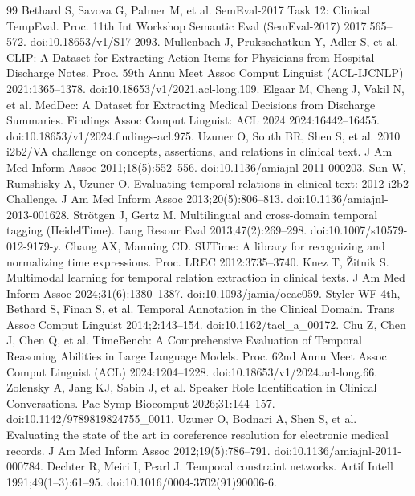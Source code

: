 \documentclass[3p,twocolumn]{elsarticle}
\begin{document}
\begin{thebibliography}{99}
\label{r39} Bethard S, Savova G, Palmer M, et al. SemEval-2017 Task 12: Clinical TempEval. Proc. 11th Int Workshop Semantic Eval (SemEval-2017) 2017:565--572. doi:10.18653/v1/S17-2093.
\label{r40} Mullenbach J, Pruksachatkun Y, Adler S, et al. CLIP: A Dataset for Extracting Action Items for Physicians from Hospital Discharge Notes. Proc. 59th Annu Meet Assoc Comput Linguist (ACL-IJCNLP) 2021:1365--1378. doi:10.18653/v1/2021.acl-long.109.
\label{r41} Elgaar M, Cheng J, Vakil N, et al. MedDec: A Dataset for Extracting Medical Decisions from Discharge Summaries. Findings Assoc Comput Linguist: ACL 2024 2024:16442--16455. doi:10.18653/v1/2024.findings-acl.975.
\label{r42} Uzuner O, South BR, Shen S, et al. 2010 i2b2/VA challenge on concepts, assertions, and relations in clinical text. J Am Med Inform Assoc 2011;18(5):552--556. doi:10.1136/amiajnl-2011-000203.
\label{r43} Sun W, Rumshisky A, Uzuner O. Evaluating temporal relations in clinical text: 2012 i2b2 Challenge. J Am Med Inform Assoc 2013;20(5):806--813. doi:10.1136/amiajnl-2013-001628.
\label{r44} Strötgen J, Gertz M. Multilingual and cross-domain temporal tagging (HeidelTime). Lang Resour Eval 2013;47(2):269--298. doi:10.1007/s10579-012-9179-y.
\label{r45} Chang AX, Manning CD. SUTime: A library for recognizing and normalizing time expressions. Proc. LREC 2012:3735--3740.
\label{r46} Knez T, Žitnik S. Multimodal learning for temporal relation extraction in clinical texts. J Am Med Inform Assoc 2024;31(6):1380--1387. doi:10.1093/jamia/ocae059.
\label{r47} Styler WF 4th, Bethard S, Finan S, et al. Temporal Annotation in the Clinical Domain. Trans Assoc Comput Linguist 2014;2:143--154. doi:10.1162/tacl\_a\_00172.
\label{r48} Chu Z, Chen J, Chen Q, et al. TimeBench: A Comprehensive Evaluation of Temporal Reasoning Abilities in Large Language Models. Proc. 62nd Annu Meet Assoc Comput Linguist (ACL) 2024:1204--1228. doi:10.18653/v1/2024.acl-long.66.
\label{r49} Zolensky A, Jang KJ, Sabin J, et al. Speaker Role Identification in Clinical Conversations. Pac Symp Biocomput 2026;31:144--157. doi:10.1142/9789819824755\_0011.
\label{r50} Uzuner O, Bodnari A, Shen S, et al. Evaluating the state of the art in coreference resolution for electronic medical records. J Am Med Inform Assoc 2012;19(5):786--791. doi:10.1136/amiajnl-2011-000784.
\label{r51} Dechter R, Meiri I, Pearl J. Temporal constraint networks. Artif Intell 1991;49(1--3):61--95. doi:10.1016/0004-3702(91)90006-6.

\end{thebibliography}
\end{document}
